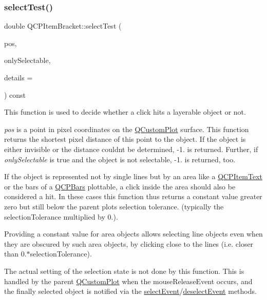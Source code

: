 \mbox{\label{class_q_c_p_item_bracket_a49a6b2f41e0a8c2a2e3a2836027a8455}} 
\subsubsection{\texorpdfstring{select\+Test()}{selectTest()}}
{\footnotesize\ttfamily double Q\+C\+P\+Item\+Bracket\+::select\+Test (\begin{DoxyParamCaption}\item[{const Q\+PointF \&}]{pos,  }\item[{bool}]{only\+Selectable,  }\item[{Q\+Variant $\ast$}]{details = {} }\end{DoxyParamCaption}) const\hspace{0.3cm}{\ttfamily [virtual]}}

This function is used to decide whether a click hits a layerable object or not.

{\itshape pos} is a point in pixel coordinates on the \hyperlink{class_q_custom_plot}{Q\+Custom\+Plot} surface. This function returns the shortest pixel distance of this point to the object. If the object is either invisible or the distance couldn\textquotesingle{}t be determined, -\/1. is returned. Further, if {\itshape only\+Selectable} is true and the object is not selectable, -\/1. is returned, too.

If the object is represented not by single lines but by an area like a \hyperlink{class_q_c_p_item_text}{Q\+C\+P\+Item\+Text} or the bars of a \hyperlink{class_q_c_p_bars}{Q\+C\+P\+Bars} plottable, a click inside the area should also be considered a hit. In these cases this function thus returns a constant value greater zero but still below the parent plot\textquotesingle{}s selection tolerance. (typically the selection\+Tolerance multiplied by 0.).

Providing a constant value for area objects allows selecting line objects even when they are obscured by such area objects, by clicking close to the lines (i.\+e. closer than 0.$\ast$selection\+Tolerance).

The actual setting of the selection state is not done by this function. This is handled by the parent \hyperlink{class_q_custom_plot}{Q\+Custom\+Plot} when the mouse\+Release\+Event occurs, and the finally selected object is notified via the \hyperlink{class_q_c_p_abstract_item_aa4b969c58797f39c9c0b6c07c7869d17}{select\+Event}/\hyperlink{class_q_c_p_abstract_item_af9093798cb07a861dcc73f93ca16c0c1}{deselect\+Event} methods.

